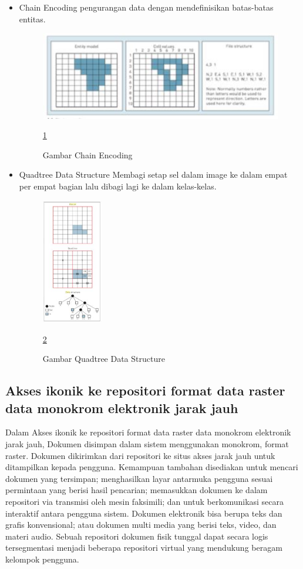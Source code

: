 \begin{itemize}
		\item  Chain Encoding
				pengurangan data dengan mendefinisikan batas-batas entitas.
				\begin{figure} [ht]
					\centerline{\includegraphics[width=1\textwidth]{figures/chainencoding.JPG}}
					\caption{Gambar Chain Encoding}
					\label{chainencoding}
					\ref{chainencoding}
				\end{figure}

		\item  Quadtree Data Structure
				Membagi setap sel dalam image ke dalam empat per empat bagian lalu dibagi lagi ke dalam kelas-kelas.
				\begin{figure} [ht]
					\centerline{\includegraphics[width=0.25\textwidth]{figures/quadtreedatastructure.JPG}}
					\caption{Gambar Quadtree Data Structure}
					\label{quadtreedatastructure}
					\ref{quadtreedatastructure}
				\end{figure}
	\end{itemize}

\subsection{Akses ikonik ke repositori format data raster data monokrom elektronik jarak jauh}
Dalam Akses ikonik ke repositori format data raster data monokrom elektronik jarak jauh, 
Dokumen disimpan dalam sistem menggunakan monokrom, format raster. 
Dokumen dikirimkan dari repositori ke situs akses jarak jauh untuk ditampilkan kepada pengguna. 
Kemampuan tambahan disediakan untuk mencari dokumen yang tersimpan; 
menghasilkan layar antarmuka pengguna sesuai permintaan yang berisi hasil pencarian; 
memasukkan dokumen ke dalam repositori via transmisi oleh mesin faksimili; 
dan untuk berkomunikasi secara interaktif antara pengguna sistem. 
Dokumen elektronik bisa berupa teks dan grafis konvensional; 
atau dokumen multi media yang berisi teks, video, dan materi audio. 
Sebuah repositori dokumen fisik tunggal dapat secara logis tersegmentasi menjadi
beberapa repositori virtual yang mendukung beragam kelompok pengguna.

